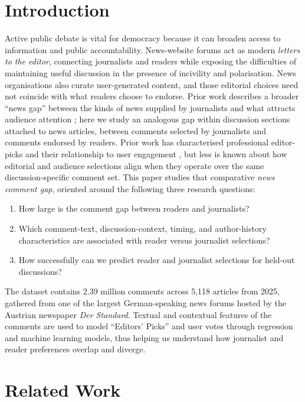 \section{Introduction}
\label{sec:introduction}
Active public debate is vital for democracy because it can broaden access to information and public accountability. News-website forums act as modern \emph{letters to the editor}, connecting journalists and readers while exposing the difficulties of maintaining useful discussion in the presence of incivility and polarisation. News organisations also curate user-generated content, and those editorial choices need not coincide with what readers choose to endorse. Prior work describes a broader ``news gap'' between the kinds of news supplied by journalists and what attracts audience attention \citep{Boczkowski2013}; here we study an analogous gap within discussion sections attached to news articles, between comments selected by journalists and comments endorsed by readers.
Prior work has characterised professional editor-picks and their relationship to user engagement \citep{Diakopoulos2015,He2024,Wang2021}, but less is known about how editorial and audience selections align when they operate over the same discussion-specific comment set. This paper studies that comparative \emph{news comment gap}, oriented around the following three research questions:

\begin{enumerate}[label=RQ\arabic*]
\item How large is the comment gap between readers and journalists?
\item Which comment-text, discussion-context, timing, and author-history characteristics are associated with reader versus journalist selections?
\item How successfully can we predict reader and journalist selections for held-out discussions?
\end{enumerate}

The dataset contains 2.39 million comments across 5,118 articles from 2025, gathered from one of the largest German-speaking news forums hosted by the Austrian newspaper \textit{Der Standard}. Textual and contextual features of the comments are used to model “Editors’ Picks” and user votes through regression and machine learning models, thus helping us understand how journalist and reader preferences overlap and diverge.

\section{Related Work}

